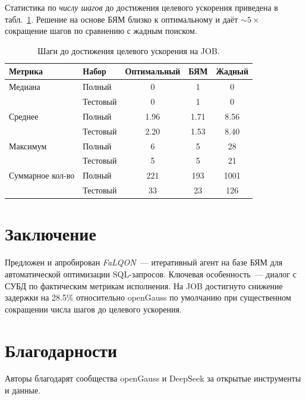 Статистика по \emph{числу шагов} до достижения целевого ускорения приведена в табл.~\ref{tab:job-steps}. Решение на основе БЯМ близко к оптимальному и даёт $\sim\!5\times$ сокращение шагов по сравнению с жадным поиском.

\begin{table}[t]
  \centering
  \caption{Шаги до достижения целевого ускорения на JOB.}
  \label{tab:job-steps}
  \begin{tabular}{llccc}
    \toprule
    \textbf{Метрика} & \textbf{Набор} & \textbf{Оптимальный} & \textbf{БЯМ} & \textbf{Жадный} \\
    \midrule
    Медиана        & Полный   & 0 & 1 & 0 \\
                   & Тестовый & 0 & 1 & 0 \\
    \midrule
    Среднее        & Полный   & 1.96 & 1.71 & 8.56 \\
                   & Тестовый & 2.20 & 1.53 & 8.40 \\
    \midrule
    Максимум       & Полный   & 6 & 5 & 28 \\
                   & Тестовый & 5 & 5 & 21 \\
    \midrule
    Суммарное кол-во & Полный & 221 & 193 & 1001 \\
                     & Тестовый & 33 & 23 & 126 \\
    \bottomrule
  \end{tabular}
\end{table}

\section{Заключение}
Предложен и апробирован \emph{FaLQON}~— итеративный агент на базе БЯМ для автоматической оптимизации SQL-запросов. Ключевая особенность~— диалог с СУБД по фактическим метрикам исполнения. На JOB достигнуто снижение задержки на 28{.}5\% относительно openGauss по умолчанию при существенном сокращении числа шагов до целевого ускорения.

\section*{Благодарности}
Авторы благодарят сообщества openGauss и DeepSeek за открытые инструменты и данные.

